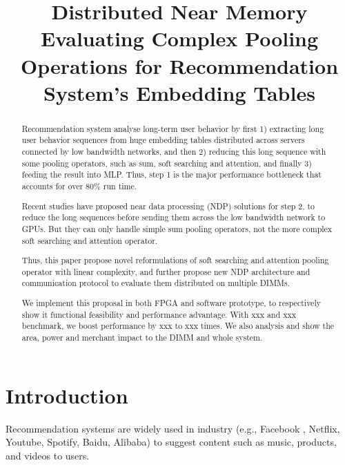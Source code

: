 \documentclass[conference]{IEEEtran}
\title{Distributed Near Memory Evaluating Complex Pooling Operations for Recommendation System's Embedding Tables }
\author{}
\begin{document}
\maketitle
\thispagestyle{firstpage}
\pagestyle{plain}




\begin{abstract}

  Recommendation system analyse long-term user behavior by 
  first 1) extracting long user behavior sequences from huge embedding tables
  distributed across servers connected by low bandwidth networks,
  and then 2) reducing this long sequence with some pooling operators,
  such as sum, soft searching and attention,
  and finally 3) feeding the result into MLP.
  Thus,
  step 1 is the major performance bottleneck that accounts for over 80\% run time.
  
  Recent studies have proposed near data processing (NDP) 
  solutions for step 2, 
  to reduce the long sequences before sending them across the low bandwidth network to GPUs.
  But they can only handle simple sum pooling operators,
  not the more complex soft searching and attention operator.
  
  Thus,
  this paper propose novel reformulations of soft searching 
  and attention pooling operator with linear complexity,
  and further propose new NDP architecture and communication protocol 
  to evaluate them distributed on multiple DIMMs.
  
  We implement this proposal in both FPGA and software prototype,
  to respectively show it functional feasibility and performance advantage.
  With xxx and xxx  benchmark,
  we boost performance by xxx to xxx times.
  We also analysis and show the area, power and merchant impact to the DIMM and whole system.
\end{abstract}

\section{Introduction}

Recommendation systems are widely used in
industry (e.g., 
Facebook \cite{recsys_dlrm_facebook}, 
Netflix\cite{recsys_netflix}, 
Youtube\cite{recsys_youtube}, 
Spotify\cite{recsys_spotify}, 
Baidu\cite{recsys_mobius_baidu},
Alibaba\cite{recsys_sim_alibaba}) 
to suggest content such as music, products, and videos to users. 
\end{document}
